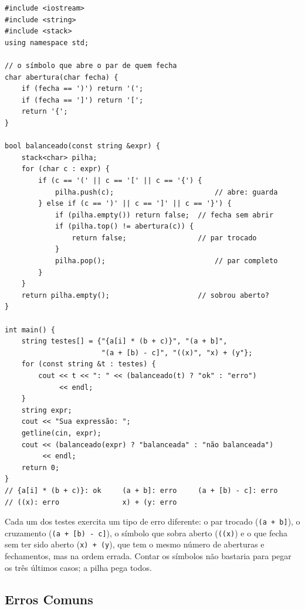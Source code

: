 \begin{codigo}
\begin{Verbatim}[breaklines=true, breaksymbolleft={}, fontsize=\footnotesize]
#include <iostream>
#include <string>
#include <stack>
using namespace std;

// o símbolo que abre o par de quem fecha
char abertura(char fecha) {
    if (fecha == ')') return '(';
    if (fecha == ']') return '[';
    return '{';
}

bool balanceado(const string &expr) {
    stack<char> pilha;
    for (char c : expr) {
        if (c == '(' || c == '[' || c == '{') {
            pilha.push(c);                        // abre: guarda
        } else if (c == ')' || c == ']' || c == '}') {
            if (pilha.empty()) return false;  // fecha sem abrir
            if (pilha.top() != abertura(c)) {
                return false;                 // par trocado
            }
            pilha.pop();                          // par completo
        }
    }
    return pilha.empty();                     // sobrou aberto?
}

int main() {
    string testes[] = {"{a[i] * (b + c)}", "(a + b]",
                       "(a + [b) - c]", "((x)", "x) + (y"};
    for (const string &t : testes) {
        cout << t << ": " << (balanceado(t) ? "ok" : "erro")
             << endl;
    }
    string expr;
    cout << "Sua expressão: ";
    getline(cin, expr);
    cout << (balanceado(expr) ? "balanceada" : "não balanceada")
         << endl;
    return 0;
}
// {a[i] * (b + c)}: ok     (a + b]: erro     (a + [b) - c]: erro
// ((x): erro               x) + (y: erro
\end{Verbatim}
\end{codigo}

Cada um dos testes exercita um tipo de erro diferente: o par trocado (\texttt{(a + b]}), o cruzamento (\texttt{(a + [b) - c]}), o símbolo que sobra aberto (\texttt{((x)}) e o que fecha sem ter sido aberto (\texttt{x) + (y}), que tem o mesmo número de aberturas e fechamentos, mas na ordem errada. Contar os símbolos não bastaria para pegar os três últimos casos; a pilha pega todos.

\subsection{Erros Comuns}

